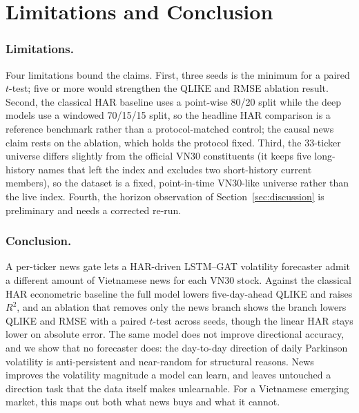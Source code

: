 \documentclass[runningheads]{llncs}
\newcommand{\ntick}{33}
\begin{document}
\section{Limitations and Conclusion}
\label{sec:conclusion}

\subsubsection{Limitations.}
Four limitations bound the claims. First, three seeds is the minimum for a paired $t$-test; five or
more would strengthen the QLIKE and RMSE ablation result. Second, the classical HAR baseline uses a
point-wise 80/20 split while the deep models use a windowed 70/15/15 split, so the headline HAR
comparison is a reference benchmark rather than a protocol-matched control; the causal news claim
rests on the ablation, which holds the protocol fixed. Third, the \ntick{}-ticker universe differs slightly
from the official VN30 constituents (it keeps five long-history names that left the index and
excludes two short-history current members), so the dataset is a fixed, point-in-time VN30-like
universe rather than the live index. Fourth, the horizon observation of Section~\ref{sec:discussion}
is preliminary and needs a corrected re-run.

\subsubsection{Conclusion.}
A per-ticker news gate lets a HAR-driven LSTM--GAT volatility forecaster admit a different amount of
Vietnamese news for each VN30 stock. Against the classical HAR econometric baseline the full model
lowers five-day-ahead QLIKE and raises $R^2$, and an ablation that removes only the news branch
shows the branch lowers QLIKE and RMSE with a paired $t$-test across seeds, though the linear HAR
stays lower on absolute error. The same model does not improve directional accuracy, and we show
that no forecaster does: the day-to-day direction of daily Parkinson volatility is anti-persistent
and near-random for structural reasons. News improves the volatility magnitude a model can learn,
and leaves untouched a direction task that the data itself makes unlearnable. For a Vietnamese
emerging market, this maps out both what news buys and what it cannot.

\end{document}
